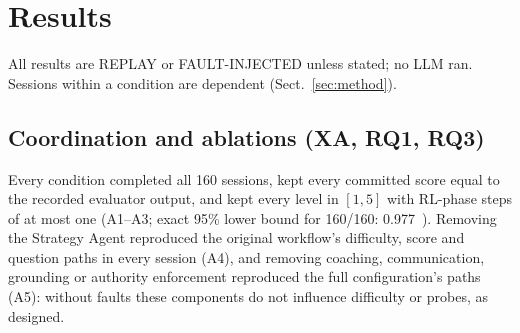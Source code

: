 \section{Results}\label{sec:results}
All results are REPLAY or FAULT-INJECTED unless stated; no LLM ran. Sessions within a condition are dependent (Sect.~\ref{sec:method}).

\subsection{Coordination and ablations (XA, RQ1, RQ3)}
\begin{table}[tbp]
\centering\scriptsize\setlength{\tabcolsep}{3pt}
\caption{XA, 160 replay sessions per condition (mean per session unless counts). compl./auth./trans.: numbers of the 160 sessions that completed, kept committed scores authoritative, kept valid transitions. chg./rev.: level changes and reversals; agr.: share of RL-phase decisions equal to the PPO (or heuristic) action; gfire: guardrail firings; strat.: decisions whose final source is the Strategy Agent; byp.: sessions with a guardrail bypass; p50/p95: pooled per-turn latency in ms; calls: agent calls.}\label{tab:xa}
\resizebox{\textwidth}{!}{}
\end{table}
\begin{table}[tbp]
\centering\scriptsize\setlength{\tabcolsep}{3pt}
\caption{XA paired differences (A$-$B) over the same 160 sessions: share of sessions with a different difficulty path, paired mean differences with 95\% percentile-bootstrap intervals, and the pooled-turn median latency difference. Intervals are descriptive (dependent sessions).}\label{tab:xapaired}
\resizebox{\textwidth}{!}{}
\end{table}
Every condition completed all 160 sessions, kept every committed score equal to the recorded evaluator output, and kept every level in $[1,5]$ with RL-phase steps of at most one (A1--A3; exact 95\% lower bound for 160/160: 0.977~\cite{cp34}). Removing the Strategy Agent reproduced the original workflow's difficulty, score and question paths in every session (A4), and removing coaching, communication, grounding or authority enforcement reproduced the full configuration's paths (A5): without faults these components do not influence difficulty or probes, as designed.

